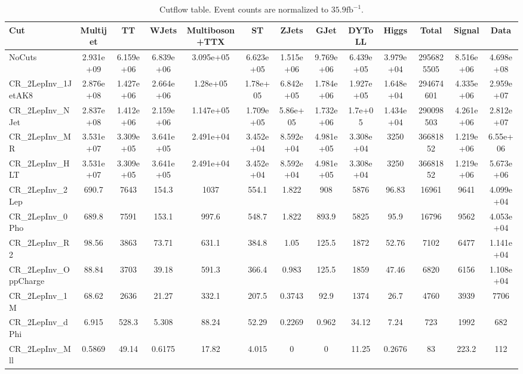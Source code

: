 \begin{sidewaystable}[p]
\centering
\fontsize{7 pt}{1 em}
\selectfont
\caption{Cutflow table. Event counts are normalized to $35.9\textrm{fb}^{-1}$. }
\begin{tabular}{| l || c | c | c | c | c | c | c | c |c || c || c || c |}
\hline
Cut & Multijet & TT & WJets & Multiboson+TTX & ST & ZJets & GJet & DYToLL & Higgs & Total & Signal & Data \\ \hline
NoCuts & 2.931e+09 & 6.159e+06 & 6.839e+06 & 3.095e+05 & 6.623e+05 & 1.515e+06 & 9.769e+06 & 6.439e+05 & 3.979e+04 & 2956825505 & 8.516e+06 & 4.698e+08 \\ 
\hline
CR_2LepInv_1JetAK8 & 2.876e+08 & 1.427e+06 & 2.664e+06 & 1.28e+05 & 1.78e+05 & 6.842e+05 & 1.784e+06 & 1.927e+05 & 1.648e+04 & 294674601 & 4.335e+06 & 2.959e+07 \\ 
\hline
CR_2LepInv_NJet & 2.837e+08 & 1.412e+06 & 2.159e+06 & 1.147e+05 & 1.709e+05 & 5.86e+05 & 1.732e+06 & 1.7e+05 & 1.434e+04 & 290098503 & 4.261e+06 & 2.812e+07 \\ 
\hline
CR_2LepInv_MR & 3.531e+07 & 3.309e+05 & 3.641e+05 & 2.491e+04 & 3.452e+04 & 8.592e+04 & 4.981e+05 & 3.308e+04 & 3250 & 36681852 & 1.219e+06 & 6.55e+06 \\ 
\hline
CR_2LepInv_HLT & 3.531e+07 & 3.309e+05 & 3.641e+05 & 2.491e+04 & 3.452e+04 & 8.592e+04 & 4.981e+05 & 3.308e+04 & 3250 & 36681852 & 1.219e+06 & 5.673e+06 \\ 
\hline
CR_2LepInv_2Lep & 690.7 & 7643 & 154.3 & 1037 & 554.1 & 1.822 & 908 & 5876 & 96.83 & 16961 & 9641 & 4.099e+04 \\ 
\hline
CR_2LepInv_0Pho & 689.8 & 7591 & 153.1 & 997.6 & 548.7 & 1.822 & 893.9 & 5825 & 95.9 & 16796 & 9562 & 4.053e+04 \\ 
\hline
CR_2LepInv_R2 & 98.56 & 3863 & 73.71 & 631.1 & 384.8 & 1.05 & 125.5 & 1872 & 52.76 & 7102 & 6477 & 1.141e+04 \\ 
\hline
CR_2LepInv_OppCharge & 88.84 & 3703 & 39.18 & 591.3 & 366.4 & 0.983 & 125.5 & 1859 & 47.46 & 6820 & 6156 & 1.108e+04 \\ 
\hline
CR_2LepInv_1M & 68.62 & 2636 & 21.27 & 332.1 & 207.5 & 0.3743 & 92.9 & 1374 & 26.7 & 4760 & 3939 & 7706 \\ 
\hline
CR_2LepInv_dPhi & 6.915 & 528.3 & 5.308 & 88.24 & 52.29 & 0.2269 & 0.962 & 34.12 & 7.24 & 723 & 1992 & 682 \\ 
\hline
CR_2LepInv_Mll & 0.5869 & 49.14 & 0.6175 & 17.82 & 4.015 & 0 & 0 & 11.25 & 0.2676 & 83 & 223.2 & 112 \\ 
\hline
\end{tabular}
\label{tab:cutflow}
\end{sidewaystable}
